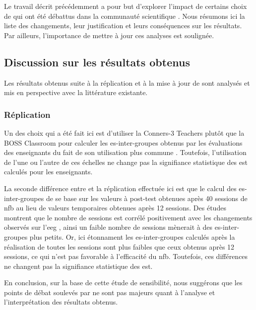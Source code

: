 Le travail décrit précédemment a pour but d'explorer l'impact de certains choix de \citet{Cortese2016} qui ont été débattus dans la communauté scientifique 
\citep{Micoulaud2016}. Nous résumons ici la liste des changements, leur justification et leurs conséquences sur les résultats. Par ailleurs, l'importance de mettre 
à jour ces analyses est soulignée.

\subsection{Discussion sur les résultats obtenus} \label{replication_and_update}

Les résultats obtenus suite à la réplication et à la mise à jour de \citet{Cortese2016} sont analysés et mis en perspective avec la littérature existante.

\subsubsection{Réplication}

Un des choix qui a été fait ici est d'utiliser la Conners-3 Teachers \citep{Conners2008} plutôt que la BOSS Classroom \citep{Shapiro2010} 
pour calculer les \gls{es}-inter-groupes obtenus par les évaluations des enseignants du fait de son utilisation plus commune \citep{Christiansen2014, Bluschke2016}.
Toutefois, l'utilisation de l'une ou l'autre de ces échelles ne change pas la signifiance statistique des \gls{est} calculés pour les enseignants. 

La seconde différence entre \citep{Cortese2016} et la réplication effectuée ici est que le calcul des \gls{es}-inter-groupes de \citet{Arnold2014} se base 
sur les valeurs à post-test obtenues après 40 sessions de \gls{nfb} au lieu de valeurs temporaires obtenues après 12 sessions. Des études montrent
que le nombre de sessions est corrélé positivement avec les changements observés sur l'\gls{eeg} \citep{Vernon2004}, ainsi un faible nombre de sessions mènerait
à des \gls{es}-inter-groupes plus petits. Or, ici étonnament les \gls{es}-inter-groupes calculés après la réalisation de toutes les sessions sont plus faibles que ceux 
obtenus après 12 sessions, ce qui n'est pas favorable à l'efficacité du \gls{nfb}. Toutefois, ces différences ne changent pas la signifiance statistique des \gls{est}. 

En conclusion, sur la base de cette étude de sensibilité, nous suggérons que les points de débat soulevés par \citep{Micoulaud2016} ne sont pas majeurs 
quant à l'analyse et l'interprétation des résultats obtenus.

